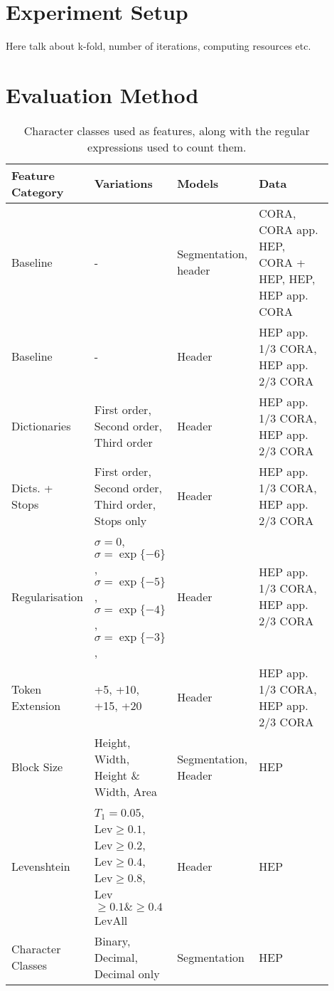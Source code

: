 \section{Experiment Setup}

Here talk about k-fold, number of iterations, computing resources etc.

\section{Evaluation Method}

\begin{table}[h]
\begin{center}
\begin{tabular}{ | p{0.2\linewidth} | p{0.25\linewidth} | p{0.15\linewidth} | p{0.3\linewidth} |}
\hline
Feature Category & Variations & Models & Data\\
\hline
Baseline & - & Segmentation, header & CORA, CORA app. HEP, CORA + HEP, HEP, HEP app. CORA \\
\hline
Baseline & - & Header & HEP app. 1/3 CORA, HEP app. 2/3 CORA \\
\hline
Dictionaries & First order, Second order, Third order & Header & HEP app. 1/3 CORA, HEP app. 2/3 CORA \\
\hline
Dicts. + Stops & First order, Second order, Third order, Stops only & Header & HEP app. 1/3 CORA, HEP app. 2/3 CORA \\
\hline
Regularisation & $\sigma=0$, $\sigma=\exp\{-6\}$,$\sigma=\exp\{-5\}$,$\sigma=\exp\{-4\}$,$\sigma=\exp\{-3\}$, & Header & HEP app. 1/3 CORA, HEP app. 2/3 CORA \\
\hline
Token Extension & +5, +10, +15, +20 & Header & HEP app. 1/3 CORA, HEP app. 2/3 CORA \\
\hline
Block Size & Height, Width, Height \& Width, Area & Segmentation, Header & HEP \\
\hline
Levenshtein & $T_1 = 0.05$, Lev$\geq0.1$, Lev$\geq0.2$, Lev$\geq0.4$, Lev$\geq0.8$, Lev$\geq0.1 \& \geq0.4$ LevAll & Header & HEP \\
\hline
Character Classes & Binary, Decimal, Decimal only & Segmentation & HEP \\
\hline
\end{tabular}
\caption[Character classes used as features, along with the regular expressions used to count them.]{Character classes used as features, along with the regular expressions used to count them.}
\label{table:experiments}
\end{center}
\end{table}

